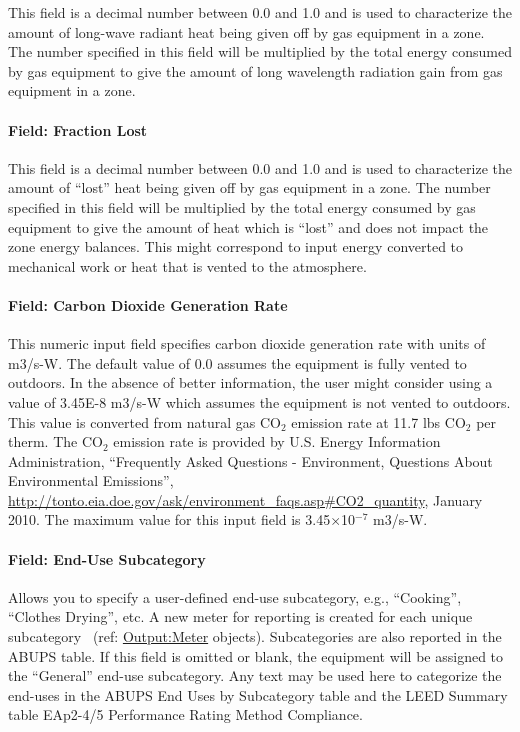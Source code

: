 This field is a decimal number between 0.0 and 1.0 and is used to characterize the amount of long-wave radiant heat being given off by gas equipment in a zone. The number specified in this field will be multiplied by the total energy consumed by gas equipment to give the amount of long wavelength radiation gain from gas equipment in a zone.

\paragraph{Field: Fraction Lost}\label{field-fraction-lost-1}

This field is a decimal number between 0.0 and 1.0 and is used to characterize the amount of ``lost'' heat being given off by gas equipment in a zone. The number specified in this field will be multiplied by the total energy consumed by gas equipment to give the amount of heat which is ``lost'' and does not impact the zone energy balances. This might correspond to input energy converted to mechanical work or heat that is vented to the atmosphere.

\paragraph{Field: Carbon Dioxide Generation Rate}\label{field-carbon-dioxide-generation-rate-1}

This numeric input field specifies carbon dioxide generation rate with units of m3/s-W. The default value of 0.0 assumes the equipment is fully vented to outdoors. In the absence of better information, the user might consider using a value of 3.45E-8 m3/s-W which assumes the equipment is not vented to outdoors. This value is converted from natural gas CO\(_{2}\) emission rate at 11.7 lbs CO\(_{2}\) per therm. The CO\(_{2}\) emission rate is provided by U.S. Energy Information Administration, ``Frequently Asked Questions - Environment, Questions About Environmental Emissions'', \url{http://tonto.eia.doe.gov/ask/environment_faqs.asp#CO2_quantity}, January 2010. The maximum value for this input field is 3.45$\times$10$^{-7}$ m3/s-W.

\paragraph{Field: End-Use Subcategory}\label{field-end-use-subcategory-2-001}

Allows you to specify a user-defined end-use subcategory, e.g., ``Cooking'', ``Clothes Drying'', etc. A new meter for reporting is created for each unique subcategory~ (ref: \hyperref[outputmeter-and-outputmetermeterfileonly]{Output:Meter} objects). Subcategories are also reported in the ABUPS table. If this field is omitted or blank, the equipment will be assigned to the ``General'' end-use subcategory. Any text may be used here to categorize the end-uses in the ABUPS End Uses by Subcategory table and the LEED Summary table EAp2-4/5 Performance Rating Method Compliance.

